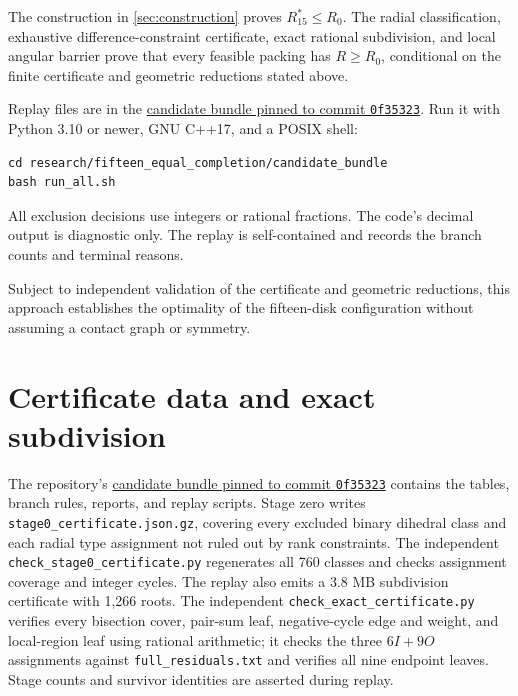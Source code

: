 \documentclass[11pt]{article}
\theoremstyle{definition}
\begin{document}
The construction in \cref{sec:construction} proves $R_{15}^*\le R_0$. The radial classification, exhaustive difference-constraint certificate, exact rational subdivision, and local angular barrier prove that every feasible packing has $R\ge R_0$, conditional on the finite certificate and geometric reductions stated above.

Replay files are in the \href{https://github.com/ziifave/unequal-circle-proof/tree/0f35323fcd59498fe17b3cd394f25f2dd8f2c3aa/research/fifteen_equal_completion/candidate_bundle}{candidate bundle pinned to commit \texttt{0f35323}}. Run it with Python 3.10 or newer, GNU C++17, and a POSIX shell:
\begin{verbatim}
cd research/fifteen_equal_completion/candidate_bundle
bash run_all.sh
\end{verbatim}
All exclusion decisions use integers or rational fractions. The code's decimal output is diagnostic only. The replay is self-contained and records the branch counts and terminal reasons.

Subject to independent validation of the certificate and geometric reductions, this approach establishes the optimality of the fifteen-disk configuration without assuming a contact graph or symmetry.

\appendix
\section{Certificate data and exact subdivision}

The repository's \href{https://github.com/ziifave/unequal-circle-proof/tree/0f35323fcd59498fe17b3cd394f25f2dd8f2c3aa/research/fifteen_equal_completion/candidate_bundle}{candidate bundle pinned to commit \texttt{0f35323}} contains the tables, branch rules, reports, and replay scripts. Stage zero writes \texttt{stage0\_certificate.json.gz}, covering every excluded binary dihedral class and each radial type assignment not ruled out by rank constraints. The independent \texttt{check\_stage0\_certificate.py} regenerates all 760 classes and checks assignment coverage and integer cycles. The replay also emits a 3.8 MB subdivision certificate with 1,266 roots. The independent \texttt{check\_exact\_certificate.py} verifies every bisection cover, pair-sum leaf, negative-cycle edge and weight, and local-region leaf using rational arithmetic; it checks the three $6I+9O$ assignments against \texttt{full\_residuals.txt} and verifies all nine endpoint leaves. Stage counts and survivor identities are asserted during replay.
\end{document}
